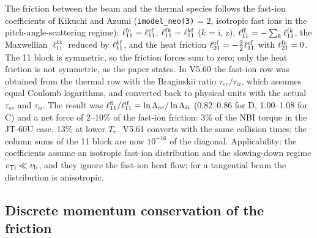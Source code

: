 \documentclass[11pt]{article}
\def\r#1{{\rm#1}}
\begin{document}
The friction between the beam and the thermal species follows the fast-ion
coefficients of Kikuchi and Azumi \cite{KA1995} (\texttt{imodel\_neo(3)} = 2, isotropic fast
ions in the pitch-angle-scattering regime): $\ell_{11}^{\r{fe}} = \ell_{11}^{\r{ef}}$,
$\ell_{11}^{\r{f}k} = \ell_{11}^{k\r{f}}$ ($k$ = i, z),
$\ell_{11}^{\r{ff}} = -\sum_k\ell_{11}^{\r{f}k}$, the Maxwellian $\ell_{11}^{kk}$ reduced
by $\ell_{11}^{k\r{f}}$, and the heat friction $\ell_{21}^{\r{ef}} = -\frac32\ell_{11}^{\r{ef}}$ with
$\ell_{21}^{\r{fe}} = 0$.  The 11 block is symmetric, so the friction forces sum to zero;
only the heat friction is not symmetric, as the paper states.  In V5.60 the
fast-ion row was obtained from the thermal row with the Braginskii ratio
$\tau_{ee}/\tau_{ii}$, which assumes equal Coulomb logarithms, and converted back to
physical units with the actual $\tau_{ee}$ and $\tau_{ii}$.  The result was
$\ell_{11}^{\r{fi}}/\ell_{11}^{\r{if}} = \ln\Lambda_{ee}/\ln\Lambda_{ii}$ (0.82--0.86 for D,
1.00--1.08 for C) and a net force of 2--10\% of the fast-ion friction: 3\% of the
NBI torque in the JT-60U case, 13\% at lower $T_\r{e}$.  V5.61 converts with the same
collision times; the column sums of the 11 block are now $10^{-16}$ of the diagonal.
Applicability: the coefficients assume an isotropic fast-ion distribution and the
slowing-down regime $v_\r{Ti} \ll v_\r{b}$, and they ignore the fast-ion heat flow;
for a tangential beam the distribution is anisotropic.

\subsection{Discrete momentum conservation of the friction}
\label{sec:frictionfem}
\end{document}
